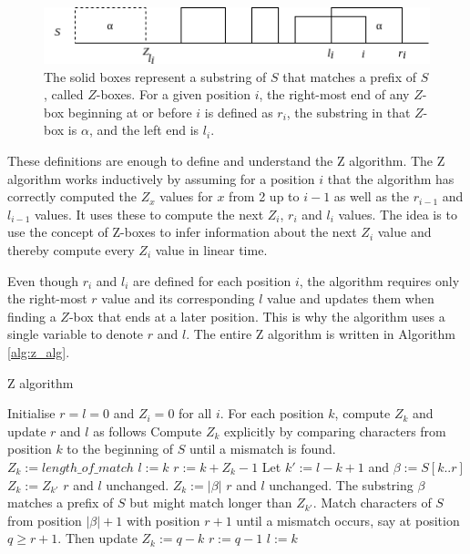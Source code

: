 \begin{figure}[t]
    \centering
    \includegraphics[width=.9\textwidth]{LaTeX/Figures/Zalg/zboxes.png}
    \caption{The solid boxes represent a substring of $S$ that matches a prefix of $S$, called $Z$-boxes. For a given position $i$, the right-most end of any $Z$-box beginning at or before $i$ is defined as $r_i$, the substring in that $Z$-box is $\alpha$, and the left end is $l_i$. }
    \label{fig:z_boxes}
\end{figure}

These definitions are enough to define and understand the Z algorithm. The Z algorithm works inductively by assuming for a position $i$ that the algorithm has correctly computed the $Z_x$ values for $x$ from 2 up to $i-1$ as well as the $r_{i-1}$ and $l_{i-1}$ values. It uses these to compute the next $Z_i$, $r_i$ and $l_i$ values. The idea is to use the concept of Z-boxes to infer information about the next $Z_i$ value and thereby compute every $Z_i$ value in linear time. 

Even though $r_i$ and $l_i$ are defined for each position $i$, the algorithm requires only the right-most $r$ value and its corresponding $l$ value and updates them when finding a $Z$-box that ends at a later position. This is why the algorithm uses a single variable to denote $r$ and $l$. The entire Z algorithm is written in Algorithm \ref{alg:z_alg}. 

\begin{algorithm}[bht!]
\caption{Z algorithm}\label{alg:z_alg}
\begin{algorithmic}
\State Initialise $r=l=0$ and $Z_i=0$ for all $i$. 
\State For each position $k$, compute $Z_k$ and update $r$ and $l$ as follows
 
    \State Compute $Z_k$ explicitly by comparing characters from position $k$ to the \State beginning of $S$ until a mismatch is found. 
    \State $Z_k:=length\_of\_match$
    \State $l:=k$
    \State $r:=k+Z_k-1$
    \State Let $k':=l-k+1$ and $\beta:=S[k..r]$
     
        \State $Z_k:=Z_{k'}$
        \State $r$ and $l$ unchanged. 
     
        \State $Z_k:=|\beta|$
        \State $r$ and $l$ unchanged. 
     
        \State The substring $\beta$ matches a prefix of $S$ but might match longer than $Z_{k'}$. \State Match characters of $S$ from position $|\beta|+1$ with position $r+1$ until a \State mismatch occurs, say at position $q\geq r+1$. Then update
        \State $Z_k:=q-k$
        \State $r:=q-1$
        \State $l:=k$
    \EndIf
\EndIf
\EndFor
\end{algorithmic}
\end{algorithm}


